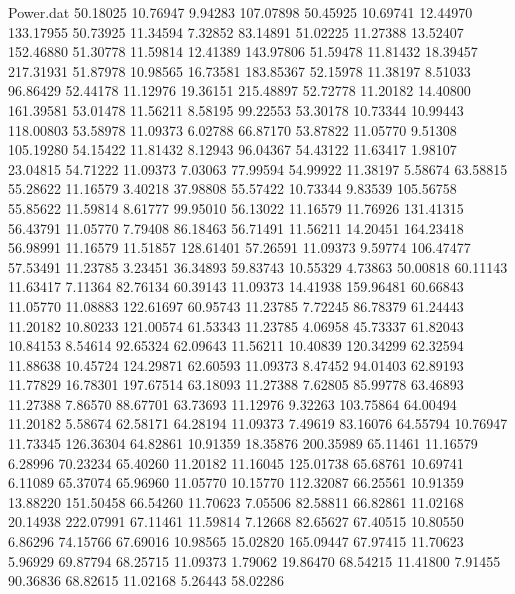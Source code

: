 \begin{filecontents}{Power.dat}
  50.18025   10.76947    9.94283  107.07898
  50.45925   10.69741   12.44970  133.17955
  50.73925   11.34594    7.32852   83.14891
  51.02225   11.27388   13.52407  152.46880
  51.30778   11.59814   12.41389  143.97806
  51.59478   11.81432   18.39457  217.31931
  51.87978   10.98565   16.73581  183.85367
  52.15978   11.38197    8.51033   96.86429
  52.44178   11.12976   19.36151  215.48897
  52.72778   11.20182   14.40800  161.39581
  53.01478   11.56211    8.58195   99.22553
  53.30178   10.73344   10.99443  118.00803
  53.58978   11.09373    6.02788   66.87170
  53.87822   11.05770    9.51308  105.19280
  54.15422   11.81432    8.12943   96.04367
  54.43122   11.63417    1.98107   23.04815
  54.71222   11.09373    7.03063   77.99594
  54.99922   11.38197    5.58674   63.58815
  55.28622   11.16579    3.40218   37.98808
  55.57422   10.73344    9.83539  105.56758
  55.85622   11.59814    8.61777   99.95010
  56.13022   11.16579   11.76926  131.41315
  56.43791   11.05770    7.79408   86.18463
  56.71491   11.56211   14.20451  164.23418
  56.98991   11.16579   11.51857  128.61401
  57.26591   11.09373    9.59774  106.47477
  57.53491   11.23785    3.23451   36.34893
  59.83743   10.55329    4.73863   50.00818
  60.11143   11.63417    7.11364   82.76134
  60.39143   11.09373   14.41938  159.96481
  60.66843   11.05770   11.08883  122.61697
  60.95743   11.23785    7.72245   86.78379
  61.24443   11.20182   10.80233  121.00574
  61.53343   11.23785    4.06958   45.73337
  61.82043   10.84153    8.54614   92.65324
  62.09643   11.56211   10.40839  120.34299
  62.32594   11.88638   10.45724  124.29871
  62.60593   11.09373    8.47452   94.01403
  62.89193   11.77829   16.78301  197.67514
  63.18093   11.27388    7.62805   85.99778
  63.46893   11.27388    7.86570   88.67701
  63.73693   11.12976    9.32263  103.75864
  64.00494   11.20182    5.58674   62.58171
  64.28194   11.09373    7.49619   83.16076
  64.55794   10.76947   11.73345  126.36304
  64.82861   10.91359   18.35876  200.35989
  65.11461   11.16579    6.28996   70.23234
  65.40260   11.20182   11.16045  125.01738
  65.68761   10.69741    6.11089   65.37074
  65.96960   11.05770   10.15770  112.32087
  66.25561   10.91359   13.88220  151.50458
  66.54260   11.70623    7.05506   82.58811
  66.82861   11.02168   20.14938  222.07991
  67.11461   11.59814    7.12668   82.65627
  67.40515   10.80550    6.86296   74.15766
  67.69016   10.98565   15.02820  165.09447
  67.97415   11.70623    5.96929   69.87794
  68.25715   11.09373    1.79062   19.86470
  68.54215   11.41800    7.91455   90.36836
  68.82615   11.02168    5.26443   58.02286

\end{filecontents}
